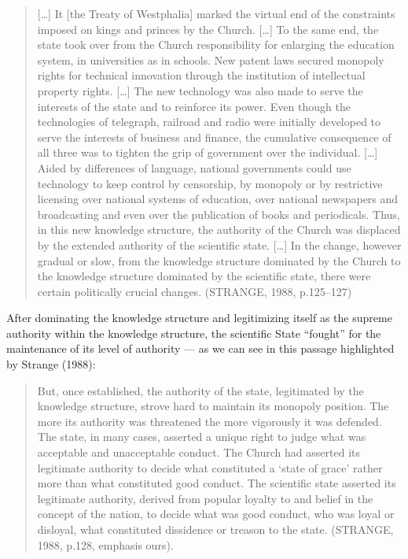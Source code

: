 \begin{quote}
{[}\ldots{]} It {[}the Treaty of Westphalia{]} marked the virtual end of the constraints imposed on kings and princes by the Church. {[}\ldots{]} To the same end, the state took over from the Church responsibility for enlarging the education system, in universities as in schools. New patent laws secured monopoly rights for technical innovation through the institution of intellectual property rights. {[}\ldots{]} The new technology was also made to serve the interests of the state and to reinforce its power. Even though the technologies of telegraph, railroad and radio were initially developed to serve the interests of business and finance, the cumulative consequence of all three was to tighten the grip of government over the individual. {[}\ldots{]} Aided by differences of language, national governments could use technology to keep control by censorship, by monopoly or by restrictive licensing over national systems of education, over national newspapers and broadcasting and even over the publication of books and periodicals. Thus, in this new knowledge structure, the authority of the Church was displaced by the extended authority of the scientific state. {[}\ldots{]} In the change, however gradual or slow, from the knowledge structure dominated by the Church to the knowledge structure dominated by the scientific state, there were certain politically crucial changes. (STRANGE, 1988, p.125--127)
\end{quote}

After dominating the knowledge structure and legitimizing itself as the supreme authority within the knowledge structure, the scientific State ``fought'' for the maintenance of its level of authority --- as we can see in this passage highlighted by Strange (1988):

\begin{quote}
But, once established, the authority of the state, legitimated by the knowledge structure, strove hard to maintain its monopoly position. The more its authority was threatened the more vigorously it was defended. The state, in many cases, asserted a unique right to judge what was acceptable and unacceptable conduct. The Church had asserted its legitimate authority to decide what constituted a `state of grace' rather more than what constituted good conduct. The scientific state asserted its legitimate authority, derived from popular loyalty to and belief in the concept of the nation, to decide what was good conduct, who was loyal or disloyal, what constituted dissidence or treason to the state. (STRANGE, 1988, p.128, emphasis ours).
\end{quote}

